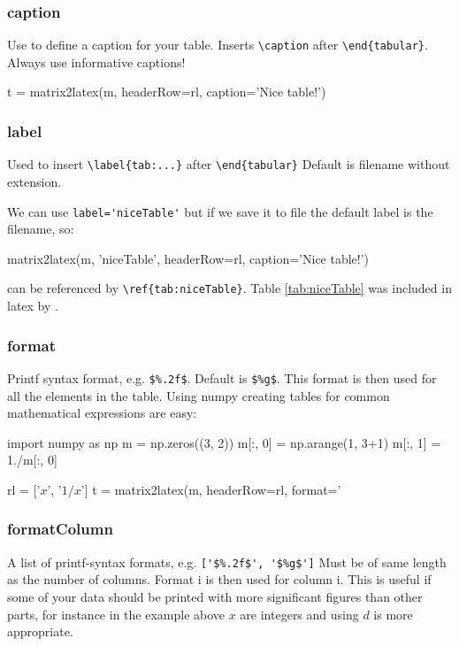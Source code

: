 \subsubsection{caption}
    Use to define a caption for your table.
    Inserts \verb!\caption! after \verb!\end{tabular}!.
Always use informative captions!
\begin{pygments}
t = matrix2latex(m, headerRow=rl,
                 caption='Nice table!')
\end{pygments}

\subsubsection{label}
Used to insert \verb!\label{tab:...}! after \verb!\end{tabular}!
Default is filename without extension.

We can use \lstinline{label='niceTable'} but if we save it to file
the default label is the filename, so:
\begin{pygments}
matrix2latex(m, 'niceTable', headerRow=rl, 
                 caption='Nice table!')
\end{pygments}
can be referenced by \verb!\ref{tab:niceTable}!. Table \ref{tab:niceTable}
was included in latex by \verb!!.


\subsubsection{format}
Printf syntax format, e.g. \lstinline{$%.2f$}. Default is \lstinline{$%g$}.
  This format is then used for all the elements in the table.
Using numpy creating tables for common mathematical expressions are easy:
\begin{pygments}
import numpy as np
m = np.zeros((3, 2))
m[:, 0] = np.arange(1, 3+1)
m[:, 1] = 1./m[:, 0]

rl = ['$x$', '$1/x$']
t = matrix2latex(m, headerRow=rl,
                 format='%
\end{pygments}

\subsubsection{formatColumn}
A list of printf-syntax formats, e.g. \lstinline{['$%.2f$', '$%g$']}
Must be of same length as the number of columns.
Format i is then used for column i.
This is useful if some of your data should be printed with more significant figures
than other parts, for instance in the example above $x$ are integers and using
$d$ is more appropriate.

